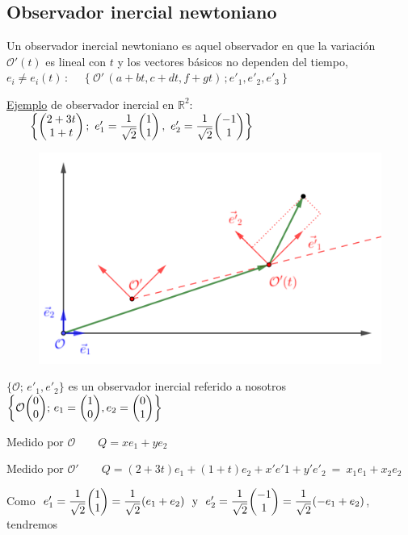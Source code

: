 \subsection{Observador inercial newtoniano}
	
Un observador inercial newtoniano es aquel observador en que la variación  $\mathcal O'(t)$ es lineal con $t$ y los vectores básicos no dependen del tiempo, $e_i\neq e_i(t)\, : \quad $ $\{ \ \mathcal O' \, (a+bt,c+dt,f+gt)\, ; e'_1,e'_2,e'_3\ \}$ 



\underline{Ejemplo} de observador inercial en $\mathbb R^2$: $\qquad \left\{  \mqty(2+3t\\1+t)\, ; \ e'_1=\dfrac 1 {\sqrt{2}} \mqty(1\\1)\, ,\   e'_2=\dfrac 1 {\sqrt{2}} \mqty(-1\\1) \right\}$

\vspace{5mm}
\begin{multicols}{2}
\begin{figure}[H]
	\centering
	\includegraphics[width=.5\textwidth]{imagenes/img30-04.png}
\end{figure}

$\{\mathcal O;\, e'_1,e'_2 \}$ es un observador inercial referido a nosotros $ \left\{ \mathcal O \mqty(0\\0);\, e_1=\mqty(1\\0), e_2=\mqty(0\\1) \right\} $ 

Medido por $\mathcal O \qquad Q=xe_1+ye_2$

Medido por $\mathcal O' \qquad Q=(2+3t)e_1+(1+t)e_2+x'e'1+y'e'_2 \ = \ x_1e_1+x_2e_2$
\end{multicols}

Como $\ e'_1=\dfrac 1{\sqrt{2}} \mqty(1\\1)=\dfrac 1{\sqrt{2}} (e_1+e_2) \ \text{ y } \ e'_2=\dfrac 1{\sqrt{2}} \mqty(-1\\1)=\dfrac 1{\sqrt{2}} (-e_1+e_2)$, tendremos


